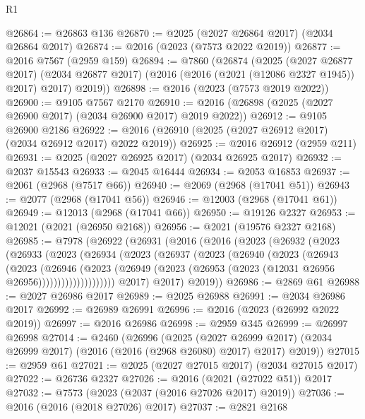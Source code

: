 \begin{lexlean}{R1}
\begin{coremodule}
@26864 := @26863 @136
@26870 := @2025 (@2027 @26864 @2017) (@2034 @26864 @2017)
@26874 := @2016 (@2023 (@7573 @2022 @2019))
@26877 := @2016 @7567 (@2959 @159)
@26894 := @7860
    (@26874
      (@2025
        (@2027 @26877 @2017)
        (@2034 @26877 @2017)
        (@2016 (@2016 (@2021 (@12086 @2327 @1945)) @2017) @2017)
        @2019))
@26898 := @2016 (@2023 (@7573 @2019 @2022))
@26900 := @9105 @7567 @2170
@26910 := @2016 (@26898 (@2025 (@2027 @26900 @2017) (@2034 @26900 @2017) @2019 @2022))
@26912 := @9105 @26900 @2186
@26922 := @2016 (@26910 (@2025 (@2027 @26912 @2017) (@2034 @26912 @2017) @2022 @2019))
@26925 := @2016 @26912 (@2959 @211)
@26931 := @2025 (@2027 @26925 @2017) (@2034 @26925 @2017)
@26932 := @2037 @15543
@26933 := @2045 @16444
@26934 := @2053 @16853
@26937 := @2061 (@2968 (@7517 @66))
@26940 := @2069 (@2968 (@17041 @51))
@26943 := @2077 (@2968 (@17041 @56))
@26946 := @12003 (@2968 (@17041 @61))
@26949 := @12013 (@2968 (@17041 @66))
@26950 := @19126 @2327
@26953 := @12021 (@2021 (@26950 @2168))
@26956 := @2021 (@19576 @2327 @2168)
@26985 := @7978
    (@26922
      (@26931
        (@2016
          (@2016
            (@2023
              (@26932
                (@2023
                  (@26933
                    (@2023
                      (@26934
                        (@2023
                          (@26937
                            (@2023
                              (@26940
                                (@2023
                                  (@26943
                                    (@2023
                                      (@26946
                                        (@2023
                                          (@26949
                                            (@2023
                                              (@26953
                                                (@2023 (@12031 @26956 @26956))))))))))))))))))))
            @2017)
          @2017)
        @2019))
@26986 := @2869 @61
@26988 := @2027 @26986 @2017
@26989 := @2025 @26988
@26991 := @2034 @26986 @2017
@26992 := @26989 @26991
@26996 := @2016 (@2023 (@26992 @2022 @2019))
@26997 := @2016 @26986
@26998 := @2959 @345
@26999 := @26997 @26998
@27014 := @2460
    (@26996
      (@2025
        (@2027 @26999 @2017)
        (@2034 @26999 @2017)
        (@2016 (@2016 (@2968 @26080) @2017) @2017)
        @2019))
@27015 := @2959 @61
@27021 := @2025 (@2027 @27015 @2017) (@2034 @27015 @2017)
@27022 := @26736 @2327
@27026 := @2016 (@2021 (@27022 @51)) @2017
@27032 := @7573 (@2023 (@2037 (@2016 @27026 @2017) @2019))
@27036 := @2016 (@2016 (@2018 @27026) @2017)
@27037 := @2821 @2168

\end{coremodule}
\end{lexlean}
